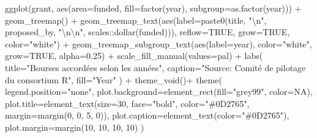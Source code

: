 \documentclass[
  letterpaper,
  DIV=11,
  numbers=noendperiod]{scrartcl}
\newenvironment{Shaded}{}{}
\newcommand{\AttributeTok}[1]{\textcolor[rgb]{0.84,0.23,0.29}{#1}}
\newcommand{\ConstantTok}[1]{\textcolor[rgb]{0.00,0.36,0.77}{#1}}
\newcommand{\DecValTok}[1]{\textcolor[rgb]{0.00,0.36,0.77}{#1}}
\newcommand{\FloatTok}[1]{\textcolor[rgb]{0.00,0.36,0.77}{#1}}
\newcommand{\FunctionTok}[1]{\textcolor[rgb]{0.44,0.26,0.76}{#1}}
\newcommand{\NormalTok}[1]{\textcolor[rgb]{0.14,0.16,0.18}{#1}}
\newcommand{\SpecialCharTok}[1]{\textcolor[rgb]{0.00,0.36,0.77}{#1}}
\newcommand{\StringTok}[1]{\textcolor[rgb]{0.01,0.18,0.38}{#1}}
\begin{document}
\begin{Shaded}
\begin{Highlighting}[]
\FunctionTok{ggplot}\NormalTok{(grant, }\FunctionTok{aes}\NormalTok{(}\AttributeTok{area=}\NormalTok{funded, }\AttributeTok{fill=}\FunctionTok{factor}\NormalTok{(year), }\AttributeTok{subgroup=}\FunctionTok{as.factor}\NormalTok{(year))) }\SpecialCharTok{+}
  \FunctionTok{geom\_treemap}\NormalTok{() }\SpecialCharTok{+}
  \FunctionTok{geom\_treemap\_text}\NormalTok{(}\FunctionTok{aes}\NormalTok{(}\AttributeTok{label=}\FunctionTok{paste0}\NormalTok{(title, }\StringTok{"}\SpecialCharTok{\textbackslash{}n}\StringTok{"}\NormalTok{, proposed\_by, }\StringTok{"}\SpecialCharTok{\textbackslash{}n\textbackslash{}n}\StringTok{"}\NormalTok{, scales}\SpecialCharTok{::}\FunctionTok{dollar}\NormalTok{(funded))), }\AttributeTok{reflow=}\ConstantTok{TRUE}\NormalTok{, }\AttributeTok{grow=}\ConstantTok{TRUE}\NormalTok{, }\AttributeTok{color=}\StringTok{"white"}\NormalTok{) }\SpecialCharTok{+}
  \FunctionTok{geom\_treemap\_subgroup\_text}\NormalTok{(}\FunctionTok{aes}\NormalTok{(}\AttributeTok{label=}\NormalTok{year), }\AttributeTok{color=}\StringTok{"white"}\NormalTok{, }\AttributeTok{grow=}\ConstantTok{TRUE}\NormalTok{, }\AttributeTok{alpha=}\FloatTok{0.25}\NormalTok{) }\SpecialCharTok{+}
  \FunctionTok{scale\_fill\_manual}\NormalTok{(}\AttributeTok{values=}\NormalTok{pal) }\SpecialCharTok{+}
  \FunctionTok{labs}\NormalTok{(}
    \AttributeTok{title=}\StringTok{"Bourses accordées selon les années"}\NormalTok{,}
    \AttributeTok{caption=}\StringTok{"Source: Comité de pilotage du consortium R"}\NormalTok{,}
    \AttributeTok{fill=}\StringTok{"Year"}
\NormalTok{  ) }\SpecialCharTok{+}
  \FunctionTok{theme\_void}\NormalTok{()}\SpecialCharTok{+}
  \FunctionTok{theme}\NormalTok{(}
    \AttributeTok{legend.position=}\StringTok{"none"}\NormalTok{,}
    \AttributeTok{plot.background=}\FunctionTok{element\_rect}\NormalTok{(}\AttributeTok{fill=}\StringTok{"grey99"}\NormalTok{, }\AttributeTok{color=}\ConstantTok{NA}\NormalTok{),}
    \AttributeTok{plot.title=}\FunctionTok{element\_text}\NormalTok{(}\AttributeTok{size=}\DecValTok{30}\NormalTok{, }\AttributeTok{face=}\StringTok{"bold"}\NormalTok{, }\AttributeTok{color=}\StringTok{"\#0D2765"}\NormalTok{, }\AttributeTok{margin=}\FunctionTok{margin}\NormalTok{(}\DecValTok{0}\NormalTok{, }\DecValTok{0}\NormalTok{, }\DecValTok{5}\NormalTok{, }\DecValTok{0}\NormalTok{)),}
    \AttributeTok{plot.caption=}\FunctionTok{element\_text}\NormalTok{(}\AttributeTok{color=}\StringTok{"\#0D2765"}\NormalTok{),}
    \AttributeTok{plot.margin=}\FunctionTok{margin}\NormalTok{(}\DecValTok{10}\NormalTok{, }\DecValTok{10}\NormalTok{, }\DecValTok{10}\NormalTok{, }\DecValTok{10}\NormalTok{)}
\NormalTok{  )}
\end{Highlighting}
\end{Shaded}
\end{document}
